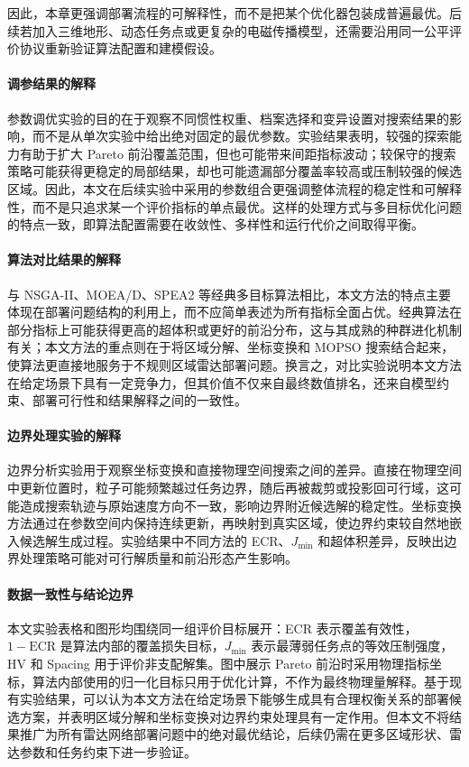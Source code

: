 因此，本章更强调部署流程的可解释性，而不是把某个优化器包装成普遍最优。后续若加入三维地形、动态任务点或更复杂的电磁传播模型，还需要沿用同一公平评价协议重新验证算法配置和建模假设。

\FloatBarrier


\paragraph{调参结果的解释}
参数调优实验的目的在于观察不同惯性权重、档案选择和变异设置对搜索结果的影响，而不是从单次实验中给出绝对固定的最优参数。实验结果表明，较强的探索能力有助于扩大 Pareto 前沿覆盖范围，但也可能带来间距指标波动；较保守的搜索策略可能获得更稳定的局部结果，却也可能遗漏部分覆盖率较高或压制较强的候选区域。因此，本文在后续实验中采用的参数组合更强调整体流程的稳定性和可解释性，而不是只追求某一个评价指标的单点最优。这样的处理方式与多目标优化问题的特点一致，即算法配置需要在收敛性、多样性和运行代价之间取得平衡。

\paragraph{算法对比结果的解释}
与 NSGA-II、MOEA/D、SPEA2 等经典多目标算法相比，本文方法的特点主要体现在部署问题结构的利用上，而不应简单表述为所有指标全面占优。经典算法在部分指标上可能获得更高的超体积或更好的前沿分布，这与其成熟的种群进化机制有关；本文方法的重点则在于将区域分解、坐标变换和 MOPSO 搜索结合起来，使算法更直接地服务于不规则区域雷达部署问题。换言之，对比实验说明本文方法在给定场景下具有一定竞争力，但其价值不仅来自最终数值排名，还来自模型约束、部署可行性和结果解释之间的一致性。

\paragraph{边界处理实验的解释}
边界分析实验用于观察坐标变换和直接物理空间搜索之间的差异。直接在物理空间中更新位置时，粒子可能频繁越过任务边界，随后再被裁剪或投影回可行域，这可能造成搜索轨迹与原始速度方向不一致，影响边界附近候选解的稳定性。坐标变换方法通过在参数空间内保持连续更新，再映射到真实区域，使边界约束较自然地嵌入候选解生成过程。实验结果中不同方法的 ECR、$J_{\min}$ 和超体积差异，反映出边界处理策略可能对可行解质量和前沿形态产生影响。

\paragraph{数据一致性与结论边界}
本文实验表格和图形均围绕同一组评价目标展开：ECR 表示覆盖有效性，$1-\mathrm{ECR}$ 是算法内部的覆盖损失目标，$J_{\min}$ 表示最薄弱任务点的等效压制强度，HV 和 Spacing 用于评价非支配解集。图中展示 Pareto 前沿时采用物理指标坐标，算法内部使用的归一化目标只用于优化计算，不作为最终物理量解释。基于现有实验结果，可以认为本文方法在给定场景下能够生成具有合理权衡关系的部署候选方案，并表明区域分解和坐标变换对边界约束处理具有一定作用。但本文不将结果推广为所有雷达网络部署问题中的绝对最优结论，后续仍需在更多区域形状、雷达参数和任务约束下进一步验证。

